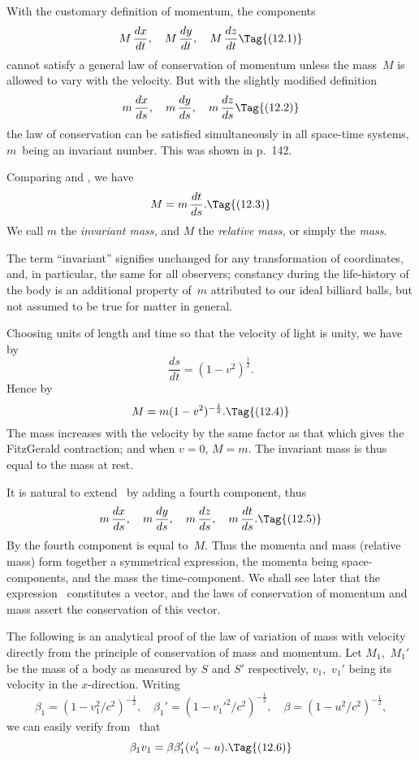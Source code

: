\documentclass[12pt]{book}
\begin{document}
With the customary definition of momentum, the components
\[
M\, \frac{dx}{dt},\quad
M\, \frac{dy}{dt},\quad
M\, \frac{dz}{dt}
\Tag{(12.1)}
\]
cannot satisfy a general law of conservation of momentum unless the mass~$M$
%
is allowed to vary with the velocity. But with the slightly modified definition
\[
m\, \frac{dx}{ds},\quad
m\, \frac{dy}{ds},\quad
m\, \frac{dz}{ds}
\Tag{(12.2)}
\]
the law of conservation can be satisfied simultaneously in all space-time
systems, $m$~being an invariant number. This was shown in  p.~142.

Comparing  and , we have
\[
M = m\, \frac{dt}{ds}.
\Tag{(12.3)}
\]
We call $m$ the \emph{invariant mass,} and $M$ the \emph{relative mass,} or simply the \emph{mass}.

The term ``invariant'' signifies unchanged for any transformation of
coordinates, and, in particular, the same for all observers; constancy during
the life\hyp{}history of the body is an additional property of~$m$ attributed to our
ideal billiard balls, but not assumed to be true for matter in general.

Choosing units of length and time so that the velocity of light is unity,
we have by~
\[
\frac{ds}{dt} = (1 - v^2)^{\frac{1}{2}}.
\]
Hence by 
\[
M = m(1 - v^2)^{-\frac{1}{2}}.
\Tag{(12.4)}
\]
The mass increases with the velocity by the same factor as that which gives
the FitzGerald contraction; and when $v = 0$, $M = m$. The invariant mass is
thus equal to the mass at rest.

It is natural to extend~ by adding a fourth component, thus
\[
m\, \frac{dx}{ds},\quad
m\, \frac{dy}{ds},\quad
m\, \frac{dz}{ds},\quad
m\, \frac{dt}{ds}.
\Tag{(12.5)}
\]
By  the fourth component is equal to~$M$. Thus the momenta and mass
(relative mass) form together a symmetrical expression, the momenta being
space\hyp{}components, and the mass the time\hyp{}component. We shall see later that
the expression~ constitutes a vector, and the laws of conservation of
momentum and mass assert the conservation of this vector.

The following is an analytical proof of the law of variation of mass with
velocity directly from the principle of conservation of mass and momentum.
Let $M_{1}$,~$M_{1}'$ be the mass of a body as measured by $S$ and $S'$ respectively,
$v_{1}$,~$v_{1}'$ being its velocity in the $x$-direction. Writing
\[
\beta_{1} = (1 - v_{1}^{2}/c^2)^{-\frac{1}{2}},\quad
\beta_{1}' = (1 - v_{1}'^{2}/c^2)^{-\frac{1}{2}},\quad
\beta = (1 - u^2/c^2)^{-\frac{1}{2}},
\]
we can easily verify from~ that
\[
\beta_{1}v_{1} = \beta\beta_{1}'(v_{1}' - u).
\Tag{(12.6)}
\]
\end{document}
